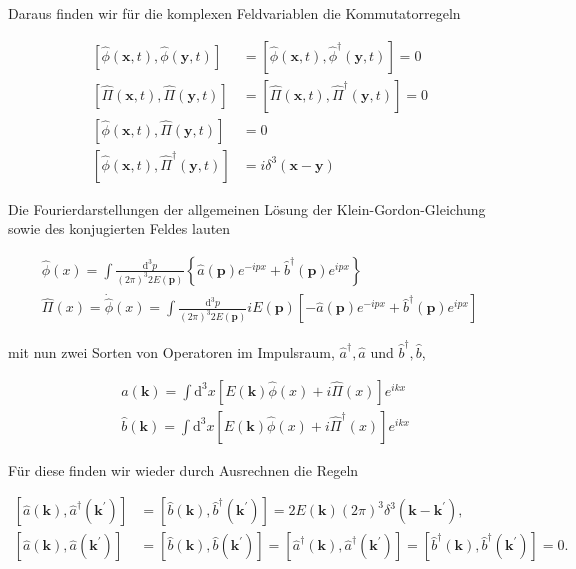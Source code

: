 \documentclass[10pt, letterpaper]{article}
\begin{document}
Daraus finden wir für die komplexen Feldvariablen die Kommutatorregeln

$$
\begin{aligned}
{[\hat{\phi}(\mathbf{x}, t), \hat{\phi}(\mathbf{y}, t)] } & =\left[\hat{\phi}(\mathbf{x}, t), \hat{\phi}^{\dagger}(\mathbf{y}, t)\right]=0 \\
{[\hat{\Pi}(\mathbf{x}, t), \hat{\Pi}(\mathbf{y}, t)] } & =\left[\hat{\Pi}(\mathbf{x}, t), \hat{\Pi}^{\dagger}(\mathbf{y}, t)\right]=0 \\
{[\hat{\phi}(\mathbf{x}, t), \hat{\Pi}(\mathbf{y}, t)] } & =0 \\
{\left[\hat{\phi}(\mathbf{x}, t), \hat{\Pi}^{\dagger}(\mathbf{y}, t)\right] } & =i \delta^{3}(\mathbf{x}-\mathbf{y})
\end{aligned}
$$

Die Fourierdarstellungen der allgemeinen Lösung der Klein-Gordon-Gleichung sowie des konjugierten Feldes lauten

$$
\begin{gathered}
\hat{\phi}(x)=\int \frac{\mathrm{d}^{3} p}{(2 \pi)^{3} 2 E(\mathbf{p})}\left\{\hat{a}(\mathbf{p}) e^{-i p x}+\hat{b}^{\dagger}(\mathbf{p}) e^{i p x}\right\} \\
\hat{\Pi}(x)=\dot{\hat{\phi}}(x)=\int \frac{\mathrm{d}^{3} p}{(2 \pi)^{3} 2 E(\mathbf{p})} i E(\mathbf{p})\left[-\hat{a}(\mathbf{p}) e^{-i p x}+\hat{b}^{\dagger}(\mathbf{p}) e^{i p x}\right]
\end{gathered}
$$

mit nun zwei Sorten von Operatoren im Impulsraum, $\hat{a}^{\dagger}, \hat{a}$ und $\hat{b}^{\dagger}, \hat{b}$,

$$
\begin{aligned}
& \hat{a}(\mathbf{k})=\int \mathrm{d}^{3} x[E(\mathbf{k}) \hat{\phi}(x)+i \hat{\Pi}(x)] e^{i k x} \\
& \hat{b}(\mathbf{k})=\int \mathrm{d}^{3} x\left[E(\mathbf{k}) \hat{\phi}(x)+i \hat{\Pi}^{\dagger}(x)\right] e^{i k x}
\end{aligned}
$$

Für diese finden wir wieder durch Ausrechnen die Regeln

$$
\begin{aligned}
{\left[\hat{a}(\mathbf{k}), \hat{a}^{\dagger}\left(\mathbf{k}^{\prime}\right)\right] } & =\left[\hat{b}(\mathbf{k}), \hat{b}^{\dagger}\left(\mathbf{k}^{\prime}\right)\right]=2 E(\mathbf{k})(2 \pi)^{3} \delta^{3}\left(\mathbf{k}-\mathbf{k}^{\prime}\right), \\
{\left[\hat{a}(\mathbf{k}), \hat{a}\left(\mathbf{k}^{\prime}\right)\right] } & =\left[\hat{b}(\mathbf{k}), \hat{b}\left(\mathbf{k}^{\prime}\right)\right]=\left[\hat{a}^{\dagger}(\mathbf{k}), \hat{a}^{\dagger}\left(\mathbf{k}^{\prime}\right)\right]=\left[\hat{b}^{\dagger}(\mathbf{k}), \hat{b}^{\dagger}\left(\mathbf{k}^{\prime}\right)\right]=0 .
\end{aligned}
$$
\end{document}
